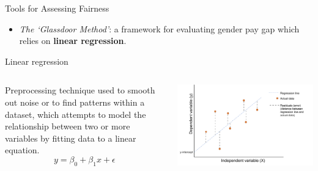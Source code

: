 \documentclass[usenames,dvipsnames]{beamer}
\begin{document}
    
    \begin{frame}{Tools for Assessing Fairness}
        \begin{itemize}
            \item \textit{The `Glassdoor Method'}: a framework for evaluating gender pay gap which relies on \textbf{linear regression}. \emph{\parencite{chamberlain2017analyze}}
        \end{itemize}
        \begin{block}{Linear regression}
            \begin{columns}
                \begin{column}{0.4715\textwidth}
                    Preprocessing technique used to smooth out noise or to find patterns within a dataset, which attempts to model the relationship between two or more variables by fitting data to a linear equation. \[y = \beta_0 + \beta_1x + \epsilon\]
                \end{column}
                \begin{column}{0.4715\textwidth}
                    \begin{center}
                        \includegraphics[width=\textwidth]{figures/simple_linear_regression.pdf}
                    \end{center}
                \end{column}
            \end{columns}
        \end{block}
    \end{frame}
    
\end{document}
